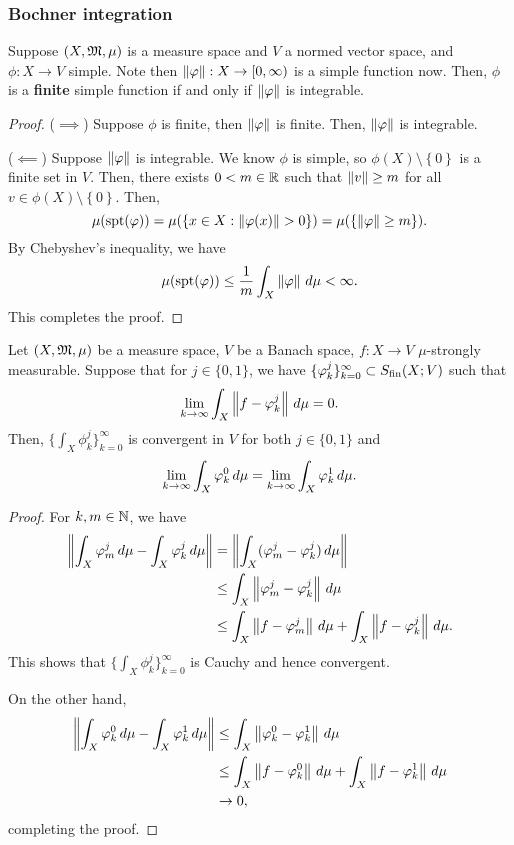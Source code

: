 \documentclass[a4paper]{article}
\renewcommand{\seqinfk}[1]{\{ #1 \}_{k=0}^\infty}
\begin{document}
\subsubsection{Bochner integration}
\begin{lemma}
Suppose $(X, \mathfrak{M}, \mu)$ is a measure space and $V$ a normed
vector space, and $\phi: X \to V$ simple.
Note then $\left\lVert \varphi\right\rVert : X \to [0, \infty)$
is a simple function now.
Then, $\phi$ is a \textbf{finite} simple function
if and only if $\left\lVert \varphi\right\rVert$ is integrable.
\end{lemma}

\begin{proof}
($\implies$) Suppose $\phi$ is finite, then
$\left\lVert \varphi\right\rVert$ is finite. Then, $\left\lVert \varphi\right\rVert$ is integrable.

($\impliedby$) Suppose $\left\lVert \varphi\right\rVert$ is integrable. We know
$\phi$ is simple, so $\phi(X) \setminus \left\{ 0 \right\}$
is a finite set in $V$. Then, there exists $0 < m \in \mathbb{R}$ such
that $\left\lVert v\right\rVert \geq m$ for all $v \in \phi(X) \setminus \left\{
0 \right\}$. Then,
\[
\mu(\operatorname{spt}(\varphi)) = \mu(\{x \in X : \left\lVert \varphi(x)\right\rVert > 0\})
= \mu(\{\left\lVert \varphi\right\rVert \geq m\}).
\]
By Chebyshev's inequality, we have
\[
\mu(\operatorname{spt}(\varphi)) \leq \frac{1}{m} \int_X \left\lVert \varphi\right\rVert \, d \mu < \infty.
\]
This completes the proof.
\end{proof}

\begin{lemma}
Let $(X, \mathfrak{M}, \mu)$ be a measure space, $V$ be a Banach space,
$f: X \to V$ $\mu$-strongly measurable. Suppose that for
$j \in \{0, 1\}$, we have $\seqinfk{\phi_k^j} \subset \Sfin(X; V)$
such that
\[
  \lim_{k \to \infty} \int_X \left\lVert f - \varphi_k^j\right\rVert \, d \mu = 0.
\]
Then, $\seqinfk{\int_X \phi_k^j}$ is convergent in $V$
for both $j \in \{0, 1\}$ and
\[
\lim_{k \to \infty} \int_X \varphi_k^0 \, d \mu =
\lim_{k \to \infty} \int_X \varphi_k^1 \, d \mu.
\]
\end{lemma}

\begin{proof}
For $k, m \in \mathbb{N}$, we have
\[
\begin{aligned}
  \left\lVert \int_X \varphi_m^j \, d\mu - \int_X \varphi_k^j \, d \mu\right\rVert
  &= \left\lVert \int_X (\varphi_m^j - \varphi_k^j) \, d \mu\right\rVert \\
  &\leq \int_X \left\lVert \varphi_m^j - \varphi_k^j\right\rVert \, d \mu \\
  &\leq \int_X \left\lVert f - \varphi_m^j\right\rVert \, d \mu
  + \int_X \left\lVert f - \varphi_k^j\right\rVert \, d \mu.
\end{aligned}
\]
This shows that $\seqinfk{\int_X \phi_k^j}$ is Cauchy
and hence convergent.

On the other hand,
\[
\begin{aligned}
\left\lVert \int_X \varphi_k^0 \, d \mu - \int_X \varphi_k^1 \, d \mu\right\rVert
&\leq \int_X \left\lVert \varphi_k^0 - \varphi_k^1\right\rVert \, d \mu \\
&\leq \int_X \left\lVert f - \varphi_k^0\right\rVert \, d \mu
+ \int_X \left\lVert f - \varphi_k^1\right\rVert \, d \mu \\
&\to 0,
\end{aligned}
\]
completing the proof.
\end{proof}
\end{document}
